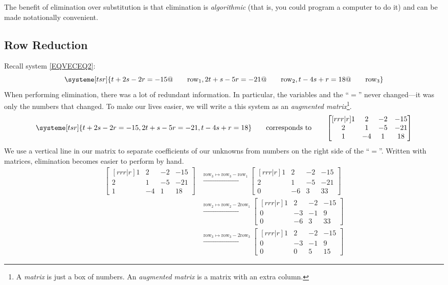 	The benefit of elimination over substitution is that elimination
	is \emph{algorithmic} (that is, you could program a computer to do it)
	and can be made notationally convenient.

\subsection{Row Reduction}
	Recall system \eqref{EQVECEQ2}:
	\[
		\systeme[tsr]{
			t+2s-2r=-15@\qquad\text{row}_1,
			2t+s-5r=-21@\qquad\text{row}_2,
			t-4s+r=18@\qquad\text{row}_3
		}
	\]
	When performing elimination, there was a lot of redundant information. 
	In particular, the variables and the ``$=$'' never changed---it was
	only the numbers that changed. To make our lives easier, we will
	write a this system as an \emph{augmented matrix}\footnote{
	A \emph{matrix} is just a box of numbers. An \emph{augmented matrix} is a matrix
	with an extra column.
	}.
	\[
		\systeme[tsr]{
			t+2s-2r=-15,
			2t+s-5r=-21,
			t-4s+r=18
		}\qquad\text{corresponds to}\qquad
		\begin{bmatrix}[rrr|r]
			1&2&-2 & -15\\
			2&1&-5&-21\\
			1&-4&1&18
		\end{bmatrix}
	\]
	We use a vertical line in our matrix to separate coefficients of our unknowns
	from numbers on the right side of the ``$=$''. Written with matrices, elimination
	becomes easier to perform by hand.
	\begin{align*}
		\begin{bmatrix}[rrr|r]
			1&2&-2 & -15\\
			2&1&-5&-21\\
			1&-4&1&18
		\end{bmatrix}
		&\xrightarrow{\text{row}_3\mapsto\text{row}_3-\text{row}_1}
		\begin{bmatrix}[rrr|r]
			1&2&-2 & -15\\
			2&1&-5&-21\\
			0&-6&3&33
		\end{bmatrix}\\
		&\xrightarrow{\text{row}_2\mapsto\text{row}_2-2\text{row}_1}
		\begin{bmatrix}[rrr|r]
			1&2&-2 & -15\\
			0&-3&-1&9\\
			0&-6&3&33
		\end{bmatrix}\\
		&\xrightarrow{\text{row}_3\mapsto\text{row}_3-2\text{row}_3}
		\begin{bmatrix}[rrr|r]
			1&2&-2 & -15\\
			0&-3&-1&9\\
			0&0&5&15
		\end{bmatrix}
	\end{align*}
